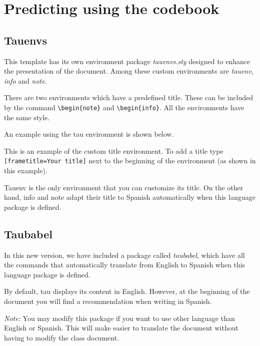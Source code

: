 \documentclass[9pt,a4paper,twoside]{tau-class/tau}
\begin{document}
\section{Predicting using the codebook}

    \subsection{Tauenvs}
	
        This template has its own environment package \textit{tauenvs.sty} designed to enhance the presentation of the document. Among these custom environments are \textit{tauenv}, \textit{info} and \textit{note}.
		
        There are two environments which have a predefined title. These can be included by the command \verb|\begin{note}| and \verb|\begin{info}|. All the environments have the same style.
			
        An example using the tau environment is shown below.
		
	\begin{tauenv}[frametitle=Environment with custom title]
            This is an example of the custom title environment. To add a title type \verb|[frametitle=Your title]| next to the beginning of the environment (as shown in this example).
	\end{tauenv}
		
        Tauenv is the only environment that you can customize its title. On the other hand, info and note adapt their title to Spanish automatically when this language package is defined.
		
    \subsection{Taubabel}

        In this new version, we have included a package called \textit{taubabel}, which have all the commands that automatically translate from English to Spanish when this language package is defined. 
        
        By default, tau displays its content in English. However, at the beginning of the document you will find a recommendation when writing in Spanish. 
		
        \textit{Note:} You may modify this package if you want to use other language than English or Spanish. This will make easier to translate the document without having to modify the class document.
		
\end{document}
